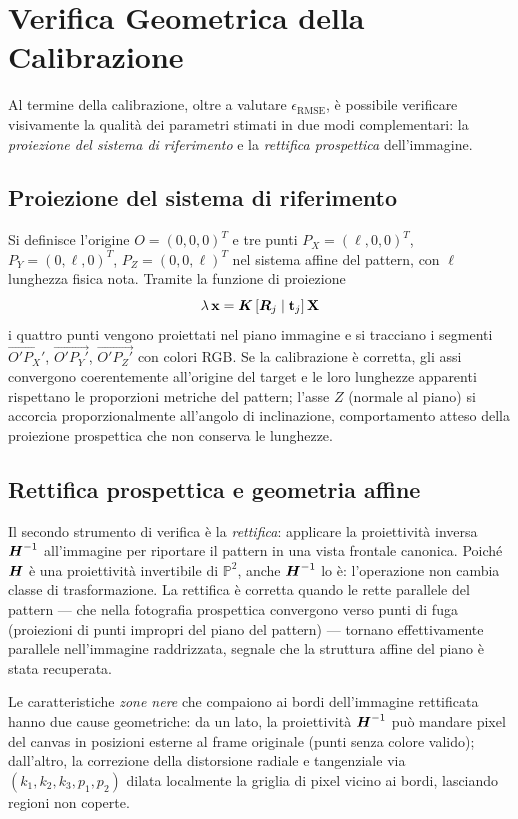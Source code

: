 \section{Verifica Geometrica della Calibrazione}
\label{sec:verifica_geometrica}

Al termine della calibrazione, oltre a valutare
\(\epsilon_{\mathrm{RMSE}}\), è possibile verificare visivamente la
qualità dei parametri stimati in due modi complementari: la
\emph{proiezione del sistema di riferimento} e la \emph{rettifica
prospettica} dell'immagine.

\subsection{Proiezione del sistema di riferimento}
\label{sub:proiezione_assi}

Si definisce l'origine \(O=(0,0,0)^T\) e tre punti
\(P_X=(\ell,0,0)^T\), \(P_Y=(0,\ell,0)^T\), \(P_Z=(0,0,\ell)^T\)
nel sistema affine del pattern, con \(\ell\) lunghezza fisica nota.
Tramite la funzione di proiezione
\[
  \lambda\,\mathbf{x} = \boldsymbol{K}\,[\boldsymbol{R}_j \mid \mathbf{t}_j]\,\mathbf{X}
\]
i quattro punti vengono proiettati nel piano immagine e si tracciano
i segmenti \(\overrightarrow{O'P_X'}\), \(\overrightarrow{O'P_Y'}\),
\(\overrightarrow{O'P_Z'}\) con colori RGB\@. Se la calibrazione è
corretta, gli assi convergono coerentemente all'origine del target
e le loro lunghezze apparenti rispettano le proporzioni metriche
del pattern; l'asse \(Z\) (normale al piano) si accorcia
proporzionalmente all'angolo di inclinazione, comportamento atteso
della proiezione prospettica che non conserva le lunghezze.

\subsection{Rettifica prospettica e geometria affine}
\label{sub:rettifica}

Il secondo strumento di verifica è la \emph{rettifica}: applicare
la proiettività inversa \(\boldsymbol{H}^{-1}\) all'immagine per riportare
il pattern in una vista frontale canonica. Poiché \(\boldsymbol{H}\) è una
proiettività invertibile di \(\mathbb{P}^2\), anche \(\boldsymbol{H}^{-1}\)
lo è: l'operazione non cambia classe di trasformazione. La rettifica
è corretta quando le rette parallele del pattern --- che nella
fotografia prospettica convergono verso punti di fuga (proiezioni
di punti impropri del piano del pattern) --- tornano effettivamente
parallele nell'immagine raddrizzata, segnale che la struttura affine
del piano è stata recuperata.

Le caratteristiche \emph{zone nere} che compaiono ai bordi
dell'immagine rettificata hanno due cause geometriche: da un lato,
la proiettività \(\boldsymbol{H}^{-1}\) può mandare pixel del canvas in
posizioni esterne al frame originale (punti senza colore valido);
dall'altro, la correzione della distorsione radiale e tangenziale
via \((k_1,k_2,k_3,p_1,p_2)\) dilata localmente la griglia di pixel
vicino ai bordi, lasciando regioni non coperte.

\newpage